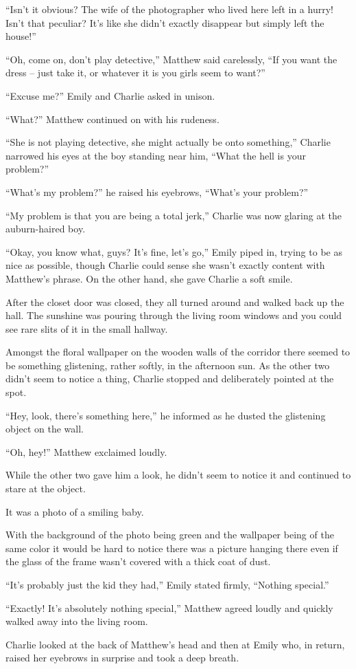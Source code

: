“Isn’t it obvious? The wife of the photographer who lived here left in a hurry! Isn’t that peculiar? It’s like she didn’t exactly disappear but simply left the house!”

“Oh, come on, don’t play detective,” Matthew said carelessly, “If you want the dress – just take it, or whatever it is you girls seem to want?”

“Excuse me?” Emily and Charlie asked in unison.

“What?” Matthew continued on with his rudeness.

“She is not playing detective, she might actually be onto something,” Charlie narrowed his eyes at the boy standing near him, “What the hell is your problem?”

“What’s my problem?” he raised his eyebrows, “What’s your problem?”

“My problem is that you are being a total jerk,” Charlie was now glaring at the auburn-haired boy.

“Okay, you know what, guys? It’s fine, let’s go,” Emily piped in, trying to be as nice as possible, though Charlie could sense she wasn’t exactly content with Matthew’s phrase. On the other hand, she gave Charlie a soft smile.

After the closet door was closed, they all turned around and walked back up the hall. The sunshine was pouring through the living room windows and you could see rare slits of it in the small hallway.

Amongst the floral wallpaper on the wooden walls of the corridor there seemed to be something glistening, rather softly, in the afternoon sun. As the other two didn’t seem to notice a thing, Charlie stopped and deliberately pointed at the spot.

“Hey, look, there’s something here,” he informed as he dusted the glistening object on the wall.

“Oh, hey!” Matthew exclaimed loudly.

While the other two gave him a look, he didn’t seem to notice it and continued to stare at the object.

It was a photo of a smiling baby.

With the background of the photo being green and the wallpaper being of the same color it would be hard to notice there was a picture hanging there even if the glass of the frame wasn’t covered with a thick coat of dust.

“It’s probably just the kid they had,” Emily stated firmly, “Nothing special.”

“Exactly! It’s absolutely nothing special,” Matthew agreed loudly and quickly walked away into the living room.

Charlie looked at the back of Matthew’s head and then at Emily who, in return, raised her eyebrows in surprise and took a deep breath.